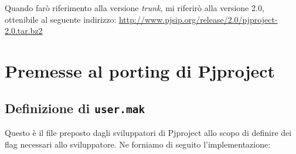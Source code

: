Quando farò riferimento alla versione \textit{trunk},
mi riferirò alla versione 2.0, ottenibile
al seguente indirizzo:
\url{http://www.pjsip.org/release/2.0/pjproject-2.0.tar.bz2}

\section{Premesse al porting di Pjproject}




\subsection{Definizione di \texttt{user.mak}}
Questo è il file preposto dagli sviluppatori di Pjproject allo scopo di definire
dei flag necessari allo sviluppatore. Ne forniamo di seguito l'implementazione:



